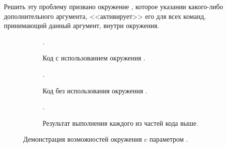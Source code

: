 Решить эту проблему призвано окружение , которое указании какого-либо дополнительного аргумента, <<активирует>> его для всех команд, принимающий данный аргумент, внутри окружения.
\begin{figure}[htp!]
    \centering
    \begin{subfigure}{\textwidth}
        \begin{Latexcode}
            \begin{rslingu}[color]
                  
                 .
            \end{rslingu}
        \end{Latexcode}
        \caption{Код с использованием окружения .}
    \end{subfigure}\vspace*{.75cm}
    \begin{subfigure}{\textwidth}
        \begin{Latexcode}
             
             
            .
        \end{Latexcode}
        \caption{Код без использования окружения .}
    \end{subfigure}\vspace*{.75cm}
    \begin{subfigure}{.9\textwidth}
        \centering
        \begin{rslingu}[color]
              
             .
        \end{rslingu}
        \caption{Результат выполнения каждого из частей кода выше.}
    \end{subfigure}
    \caption{Демонстрация возможностей окружения  c параметром .}
\end{figure}



